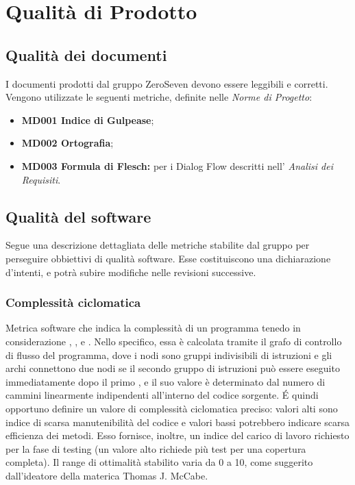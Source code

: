\chapter{Qualità di Prodotto}

\section{Qualità dei documenti}
I documenti prodotti dal gruppo ZeroSeven devono essere leggibili e corretti. Vengono utilizzate le seguenti metriche, definite nelle \textit{Norme di Progetto}:
\begin{itemize}
    \item \textbf{MD001 Indice di Gulpease};
    \item \textbf{MD002 Ortografia};
    \item \textbf{MD003 Formula di Flesch:} per i Dialog Flow descritti nell' \textit{Analisi dei Requisiti}.
\end{itemize}

\section{Qualità del software}
Segue una descrizione dettagliata delle metriche stabilite dal gruppo per perseguire obbiettivi di qualità software. \newline
Esse costituiscono una dichiarazione d'intenti, e potrà subire modifiche nelle revisioni successive.
\subsection{Complessità ciclomatica}
Metrica software che indica la complessità di un programma tenedo in considerazione , ,  e .
Nello specifico, essa è calcolata tramite il grafo di controllo di flusso del programma, dove i nodi sono gruppi indivisibili di istruzioni e gli archi connettono due nodi se il secondo gruppo di istruzioni può essere eseguito immediatamente dopo il primo , e il suo valore è determinato dal numero di cammini linearmente indipendenti all'interno del codice sorgente. 
\'E quindi opportuno definire un valore di complessità ciclomatica preciso: valori alti sono indice di scarsa manutenibilità del codice e valori bassi potrebbero indicare scarsa efficienza dei metodi.
Esso fornisce, inoltre, un indice del carico di lavoro richiesto per la fase di testing (un valore alto richiede più test per una copertura completa).
Il range di ottimalità stabilito varia da 0 a 10, come suggerito dall'ideatore della materica Thomas J. McCabe.  





